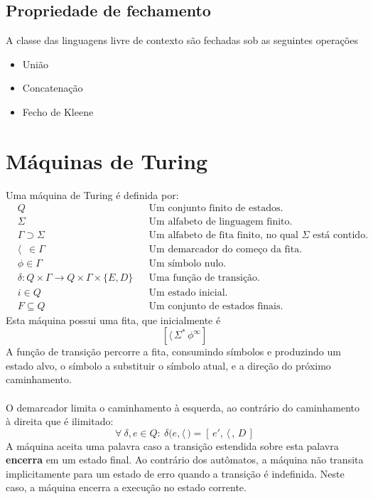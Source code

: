 \documentclass[11pt]{article}
\begin{document}
\subsection{Propriedade de fechamento}
\label{sec:orgd8a8072}
A classe das linguagens livre de contexto são fechadas sob as seguintes operações
\begin{itemize}[itemsep=0pt]
\item União
\item Concatenação
\item Fecho de Kleene
\end{itemize}
\section{Máquinas de Turing}
\label{sec:org1668b59}
Uma máquina de Turing é definida por:
\begin{align*}
  & Q && \text{Um conjunto finito de estados.} \\
  & \Sigma && \text{Um alfabeto de linguagem finito.} \\
  & \Gamma \supset \Sigma && \text{Um alfabeto de fita finito, no qual $\Sigma$ está contido.} \\
  & \langle \enspace \in \Gamma && \text{Um demarcador do começo da fita.} \\
  & \phi \in \Gamma && \text{Um símbolo nulo.} \\
  & \delta: Q \times \Gamma \to Q \times \Gamma \times \{E, D\} && \text{Uma função de transição.} \\
  & i \in Q && \text{Um estado inicial.} \\
  & F \subseteq Q && \text{Um conjunto de estados finais.}
\end{align*}
Esta máquina possui uma fita, que inicialmente é
\[
  \left[\langle\,\Sigma^*\,\phi^\infty\right]
\]
A função de transição percorre a fita, consumindo símbolos e produzindo um estado alvo,
o símbolo a substituir o símbolo atual, e a direção do próximo
caminhamento. \\ \\
O demarcador limita o caminhamento à esquerda, ao contrário do caminhamento à direita
que é ilimitado:
\[
  \forall\> \delta, e \in Q: \>\delta\big(e, \langle\,\big) = \left[\,e',\, \langle\,,\, D\,\right]
\]
A máquina aceita uma palavra caso a transição estendida sobre esta palavra \textbf{encerra} em um
estado final. Ao contrário dos autômatos, a máquina não transita implicitamente para um
estado de erro quando a transição é indefinida. Neste caso, a máquina encerra a
execução no estado corrente.
\end{document}
